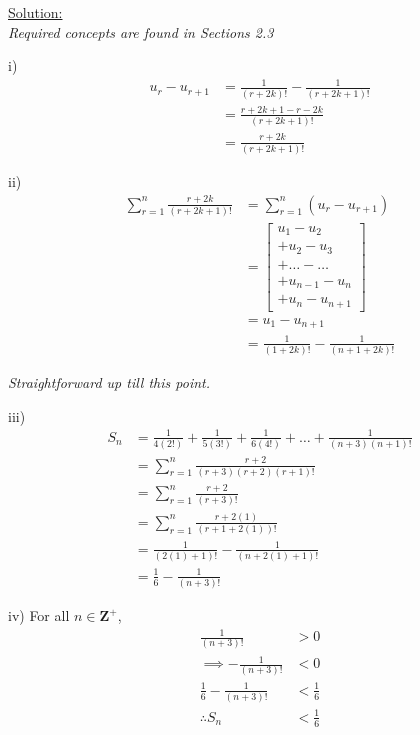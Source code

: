 \documentclass[12pt, a4paper, titlepage]{article}
\begin{document}
\begin{flushright}
\end{flushright}

\underline{Solution:} \\
\emph{Required concepts are found in Sections 2.3}

i)
\begin{align*}
    u_r - u_{r + 1} &= \frac{1}{(r + 2k)!} - \frac{1}{(r + 2k + 1)!} \\
    &= \frac{r + 2k + 1 - r - 2k}{(r + 2k + 1)!} \\
    &= \frac{r + 2k}{(r + 2k + 1)!}
\end{align*}

ii)
\begin{align*}
    \sum_{r = 1}^n \frac{r + 2k}{(r + 2k + 1)!} &= \sum_{r = 1}^n (u_r - u_{r + 1}) \\
    &= \left[
    \begin{array}{c}
        u_1 - u_2 \\
        + u_2 - u_3 \\
        + \dots - \dots \\
        + u_{n - 1} - u_n \\
        + u_n - u_{n + 1}
    \end{array}
    \right] \\
    &= u_1 - u_{n + 1} \\
    &= \frac{1}{(1 + 2k)!} - \frac{1}{(n + 1 + 2k)!}
\end{align*}

\emph{Straightforward up till this point.}

iii)
\begin{align*}
    S_n &= \frac{1}{4(2!)} + \frac{1}{5(3!)} + \frac{1}{6(4!)} + \dots + \frac{1}{(n + 3)(n + 1)!} \\
    &= \sum_{r = 1}^n \frac{r + 2}{(r + 3)(r + 2)(r + 1)!} \\
    &= \sum_{r = 1}^n \frac{r + 2}{(r + 3)!} \\
    &= \sum_{r = 1}^n \frac{r + 2(1)}{(r + 1 + 2(1))!} \\
    &= \frac{1}{(2(1) + 1)!} - \frac{1}{(n + 2(1) + 1)!} \\
    &= \frac{1}{6} - \frac{1}{(n + 3)!}
\end{align*}

iv)
For all $n \in \mathbf{Z^+}$,
\begin{align*}
    \frac{1}{(n + 3)!} &> 0 \\
    \implies -\frac{1}{(n + 3)!} &< 0 \\
    \frac{1}{6} - \frac{1}{(n + 3)!} &< \frac{1}{6} \\
    \therefore S_n &< \frac{1}{6}
\end{align*}
\end{document}
